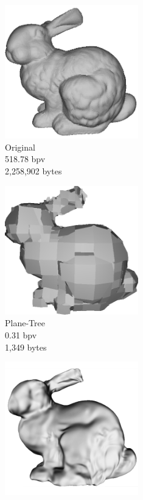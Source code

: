 \begin{figure}[!htb] 
        \begin{center}
 		\begin{subfigure}[b]{6cm}
 			   \centering
 			   \includegraphics[width=5.8cm]{images/experiments/pt_qual/original2}
				\captionsetup{justification=centering}
                \caption{Original\\518.78 bpv\\2,258,902 bytes}
                \label{fig:PT_SOTAQ2_ORIG}
        \end{subfigure}%
        \begin{subfigure}[b]{6cm}
                \includegraphics[width=5.8cm]{images/experiments/pt_qual/planetree2_shade}
                \captionsetup{justification=centering}
                \caption{Plane-Tree\\0.31 bpv\\1,349 bytes}
                \label{fig:PT_SOTAQ1_PLT}
        \end{subfigure}
        \begin{subfigure}[b]{6cm}
                \includegraphics[width=5.8cm]{images/experiments/pt_qual/khodakovsky_shade}

\end{subfigure}
\end{center}
\end{figure}

